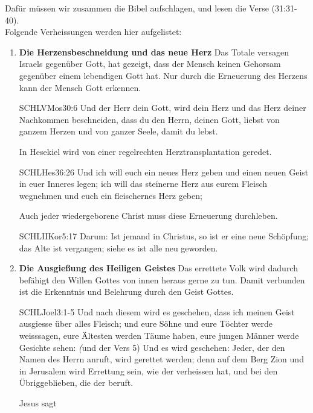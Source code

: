 \begin{otsblock}[Einführung]
    Dafür müssen wir zusammen die Bibel aufschlagen, und lesen die Verse (31:31-40).\\    
    Folgende Verheissungen werden hier aufgelistet:
    \begin{enumerate}
        \item \textbf{Die Herzensbeschneidung und das neue Herz} Das Totale versagen Israels gegenüber Gott, hat gezeigt, dass der Mensch keinen Gehorsam gegenüber einem lebendigen Gott hat. Nur durch die Erneuerung des Herzens kann der Mensch Gott erkennen.
        \begin{bibelbox}{SCHL}{VMos}{30:6}
            Und der Herr dein Gott, wird dein Herz und das Herz deiner Nachkommen beschneiden, dass du den Herrn, deinen Gott, liebst von ganzem Herzen und von ganzer Seele, damit du lebst.            
        \end{bibelbox}
        In Hesekiel wird von einer regelrechten Herztransplantation geredet.
        \begin{bibelbox}{SCHL}{Hes}{36:26}
            Und ich will euch ein neues Herz geben und einen neuen Geist in euer Inneres legen; ich will das steinerne Herz aus eurem Fleisch wegnehmen und euch ein fleischernes Herz geben;
        \end{bibelbox}
        Auch jeder wiedergeborene Christ muss diese Erneuerung durchleben. 
        \begin{bibelbox}{SCHL}{IIKor}{5:17}
            Darum: Ist jemand in Christus, so ist er eine neue Schöpfung; das Alte ist vergangen; siehe es ist alle neu geworden.
        \end{bibelbox}
        \item \textbf{Die Ausgießung des Heiligen Geistes} Das errettete Volk wird dadurch befähigt den Willen Gottes von innen heraus gerne zu tun. Damit verbunden ist die Erkenntnis und Belehrung durch den Geist Gottes.
        \begin{bibelbox}{SCHL}{Joel}{3:1-5}
            Und nach diesem wird es geschehen, dass ich meinen Geist ausgiesse über alles Fleisch; und eure Söhne und eure Töchter werde weisssagen, eure Ältesten werden Täume haben, eure jungen Männer werde Gesichte sehen:
            \textit(und der Vers 5)
            Und es wird geschehen: Jeder, der den Namen des Herrn anruft, wird gerettet werden; denn auf dem Berg Zion und in Jerusalem wird Errettung sein, wie der \herr{} verheissen hat, und bei den Übriggeblieben, die der \herr{} beruft.
        \end{bibelbox}
        Jesus sagt

\end{enumerate}
\end{otsblock}
